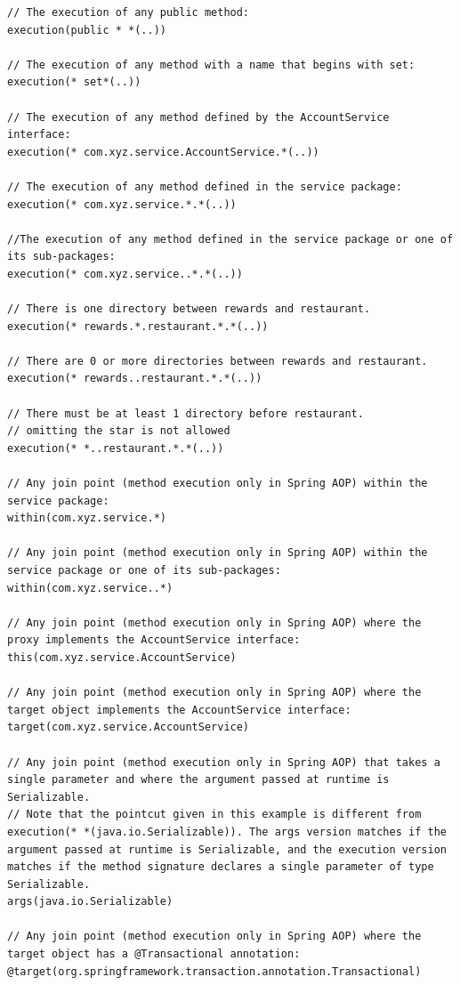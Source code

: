 \documentclass{scrartcl}
\begin{document}
\begin{lstlisting}
// The execution of any public method:
execution(public * *(..))

// The execution of any method with a name that begins with set:
execution(* set*(..))

// The execution of any method defined by the AccountService interface:
execution(* com.xyz.service.AccountService.*(..))

// The execution of any method defined in the service package:
execution(* com.xyz.service.*.*(..))

//The execution of any method defined in the service package or one of its sub-packages:
execution(* com.xyz.service..*.*(..))

// There is one directory between rewards and restaurant.
execution(* rewards.*.restaurant.*.*(..))

// There are 0 or more directories between rewards and restaurant.
execution(* rewards..restaurant.*.*(..))

// There must be at least 1 directory before restaurant.
// omitting the star is not allowed
execution(* *..restaurant.*.*(..))

// Any join point (method execution only in Spring AOP) within the service package:
within(com.xyz.service.*)

// Any join point (method execution only in Spring AOP) within the service package or one of its sub-packages:
within(com.xyz.service..*)

// Any join point (method execution only in Spring AOP) where the proxy implements the AccountService interface:
this(com.xyz.service.AccountService)

// Any join point (method execution only in Spring AOP) where the target object implements the AccountService interface:
target(com.xyz.service.AccountService)

// Any join point (method execution only in Spring AOP) that takes a single parameter and where the argument passed at runtime is Serializable.
// Note that the pointcut given in this example is different from execution(* *(java.io.Serializable)). The args version matches if the argument passed at runtime is Serializable, and the execution version matches if the method signature declares a single parameter of type Serializable.
args(java.io.Serializable)

// Any join point (method execution only in Spring AOP) where the target object has a @Transactional annotation:
@target(org.springframework.transaction.annotation.Transactional)


\end{lstlisting}
\end{document}
